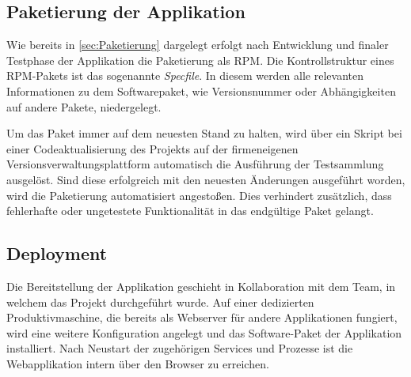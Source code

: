 \subsection{Paketierung der Applikation}
\label{sec:Paketierung der Applikation}
Wie bereits in \ref{sec:Paketierung} dargelegt erfolgt nach Entwicklung und finaler Testphase der
Applikation die Paketierung als RPM. Die Kontrollstruktur eines RPM-Pakets ist das sogenannte
\textit{Specfile}. In diesem werden alle relevanten Informationen zu dem Softwarepaket,
wie \bspw Versionsnummer oder Abhängigkeiten auf andere Pakete, niedergelegt.

Um das Paket immer auf dem neuesten Stand zu halten, wird über ein Skript bei einer
Codeaktualisierung des Projekts auf der firmeneigenen Versionsverwaltungsplattform automatisch die
Ausführung der Testsammlung ausgelöst. Sind diese erfolgreich mit den neuesten Änderungen ausgeführt
worden, wird die Paketierung automatisiert angestoßen. Dies verhindert zusätzlich, dass fehlerhafte
oder ungetestete Funktionalität in das endgültige Paket gelangt.

\subsection{Deployment}
\label{sec:Deployment}
Die Bereitstellung der Applikation geschieht in Kollaboration mit dem Team, in welchem das
Projekt durchgeführt wurde. Auf einer dedizierten Produktivmaschine, die bereits als Webserver für
andere Applikationen fungiert, wird eine weitere Konfiguration angelegt und das Software-Paket der
Applikation installiert. Nach Neustart der zugehörigen Services und Prozesse ist die
Webapplikation intern über den Browser zu erreichen.
